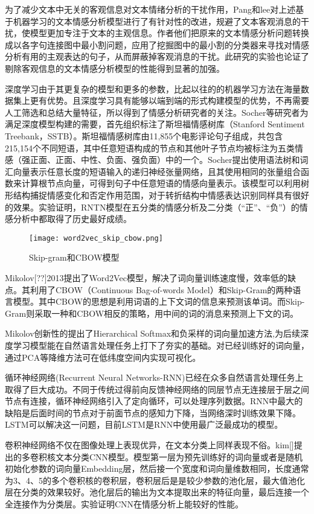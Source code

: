 为了减少文本中无关的客观信息对文本情绪分析的干扰作用，Pang和lee对上述基于机器学习的文本情感分析模型进行了有针对性的改进，规避了文本客观消息的干扰，使模型更加专注于文本的主观信息。作者他们把原来的文本情感分析问题转换成以各字句连接图中最小割问题，应用了挖掘图中的最小割的分类器来寻找对情感分析有用的主观表达的句子，从而屏蔽掉客观消息的干扰。此研究的实验也论证了剔除客观信息的文本情感分析模型的性能得到显著的加强。


深度学习由于其更复杂的模型和更多的参数，比起以往的的机器学习方法在海量数据集上更有优势。且深度学习具有能够以端到端的形式构建模型的优势，不再需要人工筛选和总结大量特征，所以得到了情感分析研究者的关注。Socher等研究者为满足深度模型构建的需要，首先组织标注了斯坦福情感树库（Stanford Sentiment Treebank，SSTB）。斯坦福情感树库由11,855个电影评论句子组成，共包含215,154个不同短语，其中任意短语构成的节点和其他叶子节点均被标注为五类情感（强正面、正面、中性、负面、强负面）中的一个。Socher提出使用语法树和词汇向量表示任意长度的短语输入的递归神经张量网络，且其使用相同的张量组合函数来计算根节点向量，可得到句子中任意短语的情感向量表示。该模型可以利用树形结构捕捉情感变化和否定作用范围，对于转折结构中情感表达识别同样具有很好的效果。实验证明，RNTN模型在五分类的情感分析及二分类（“正”、“负”）的情感分析中都取得了历史最好成绩。

\begin{figure}[htbp]
	\centering
	\texttt{[image: word2vec\_skip\_cbow.png]}
	\caption[rnn_vanish]{Skip-gram和CBOW模型}
\end{figure}
Mikolov[??]2013提出了Word2Vec模型，解决了词向量训练速度慢，效率低的缺点。其利用了CBOW（Continuous Bag-of-words Model）和Skip-Gram的两种语言模型。其中CBOW的思想是利用词语的上下文词的信息来预测该单词。而Skip-Gram则采取一种和CBOW相反的策略，用中间的词的消息来预测上下文的词。

Mikolov创新性的提出了Hierarchical Softmax和负采样的词向量加速方法,为后续深度学习模型能在自然语言处理任务上打下了夯实的基础。对已经训练好的词向量，通过PCA等降维方法可在低纬度空间内实现可视化。

循环神经网络(Recurrent Neural Networks-RNN)已经在众多自然语言处理任务上取得了巨大成功。不同于传统过得前向反馈神经网络的同层节点无连接层于层之间节点有连接，循环神经网络引入了定向循环，可以处理序列数据。RNN中最大的缺陷是后面时间的节点对于前面节点的感知力下降，当网络深时训练效果下降。LSTM可以解决这一问题，目前LSTM是RNN中使用最广泛最成功的模型。

卷积神经网络不仅在图像处理上表现优异，在文本分类上同样表现不俗。kim[]提出的多卷积核文本分类CNN模型。模型第一层为预先训练好的词向量或者是随机初始化参数的词向量Embedding层，然后接一个宽度和词向量维数相同，长度通常为3、4、5的多个卷积核的卷积层，卷积层后是是较少参数的池化层，最大值池化层在分类的效果较好。池化层后的输出为文本提取出来的特征向量，最后连接一个全连接作为分类层。实验证明CNN在情感分析上能较好的性能。

